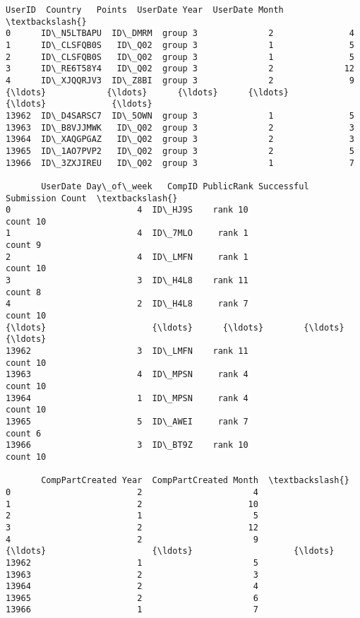\documentclass{report}
\makeatletter
\newcommand{\boxspacing}{\kern\kvtcb@left@rule\kern\kvtcb@boxsep}
\newcommand{\prompt}[4]{
        \ttfamily\llap{{\color{#2}[#3]:\hspace{3pt}#4}}\vspace{-\baselineskip}
    }
\makeatother
\begin{document}
            \begin{tcolorbox}[breakable, size=fbox, boxrule=.5pt, pad at break*=1mm, opacityfill=0]
\prompt{Out}{outcolor}{18}{\boxspacing}
\begin{Verbatim}[commandchars=\\\{\}]
            UserID  Country   Points  UserDate Year  UserDate Month  \textbackslash{}
0      ID\_N5LTBAPU  ID\_DMRM  group 3              2               4
1      ID\_CLSFQB0S   ID\_Q02  group 3              1               5
2      ID\_CLSFQB0S   ID\_Q02  group 3              1               5
3      ID\_RE6T58Y4   ID\_Q02  group 3              2              12
4      ID\_XJQQRJV3  ID\_Z8BI  group 3              2               9
{\ldots}            {\ldots}      {\ldots}      {\ldots}            {\ldots}             {\ldots}
13962  ID\_D4SARSC7  ID\_5OWN  group 3              1               5
13963  ID\_B8VJJMWK   ID\_Q02  group 3              2               3
13964  ID\_XAQGPGAZ   ID\_Q02  group 3              2               3
13965  ID\_1AO7PVP2   ID\_Q02  group 3              2               5
13966  ID\_3ZXJIREU   ID\_Q02  group 3              1               7

       UserDate Day\_of\_week   CompID PublicRank Successful Submission Count  \textbackslash{}
0                         4  ID\_HJ9S    rank 10                    count 10
1                         4  ID\_7MLO     rank 1                     count 9
2                         4  ID\_LMFN     rank 1                    count 10
3                         3  ID\_H4L8    rank 11                     count 8
4                         2  ID\_H4L8     rank 7                    count 10
{\ldots}                     {\ldots}      {\ldots}        {\ldots}                         {\ldots}
13962                     3  ID\_LMFN    rank 11                    count 10
13963                     4  ID\_MPSN     rank 4                    count 10
13964                     1  ID\_MPSN     rank 4                    count 10
13965                     5  ID\_AWEI     rank 7                     count 6
13966                     3  ID\_BT9Z    rank 10                    count 10

       CompPartCreated Year  CompPartCreated Month  \textbackslash{}
0                         2                      4
1                         2                     10
2                         1                      5
3                         2                     12
4                         2                      9
{\ldots}                     {\ldots}                    {\ldots}
13962                     1                      5
13963                     2                      3
13964                     2                      4
13965                     2                      6
13966                     1                      7


\end{Verbatim}
\end{tcolorbox}
\end{document}
